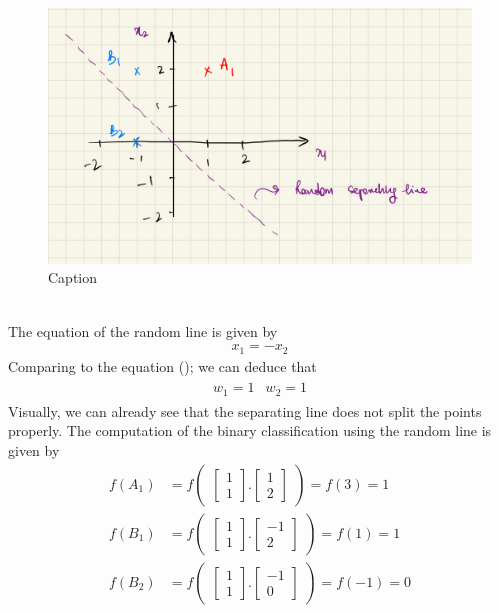 \begin{figure}[!htbp]
  \centering
  \includegraphics[scale=0.15]{CHAPTER_2/c2_fig_perceptron_example_2.jpeg}
  \caption{Caption}
  \label{fig:perceptron_example_2}
\end{figure}\\
The equation of the random line is given by
\begin{align}
  x_1 = - x_2
\end{align}
Comparing to the equation (); we can deduce that 
\begin{align}
  \begin{matrix}
    w_1 = 1 & w_2 = 1
  \end{matrix}
\end{align}
Visually, we can already see that the separating line does not split the points properly. The computation of the binary classification using the random line is given by
\begin{align}
  f(A_1) &= f\begin{pmatrix}
    \begin{bmatrix}
      1\\
      1
    \end{bmatrix}.\begin{bmatrix}
      1 \\
      2
    \end{bmatrix}
  \end{pmatrix} = f(3) = 1 \\
  f(B_1) &= f\begin{pmatrix}
    \begin{bmatrix}
      1\\
      1
    \end{bmatrix}.\begin{bmatrix}
      -1 \\
      2
    \end{bmatrix}
  \end{pmatrix} = f(1) = 1 \\
  f(B_2) &= f\begin{pmatrix}
    \begin{bmatrix}
      1\\
      1
    \end{bmatrix}.\begin{bmatrix}
      -1 \\
      0
    \end{bmatrix}
  \end{pmatrix} = f(-1) = 0
\end{align}
